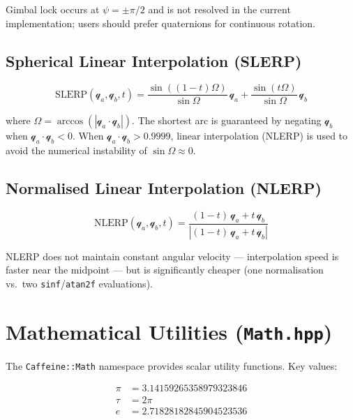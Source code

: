 \documentclass[12pt, a4paper]{report}
\theoremstyle{definition}
\theoremstyle{remark}
\begin{document}
Gimbal lock occurs at $\psi = \pm\pi/2$ and is not resolved in the current
implementation; users should prefer quaternions for continuous rotation.

\subsection{Spherical Linear Interpolation (SLERP)}

\begin{equation}
\text{SLERP}(\mathcal{q}_a, \mathcal{q}_b, t)
= \frac{\sin((1-t)\Omega)}{\sin\Omega}\,\mathcal{q}_a
+ \frac{\sin(t\Omega)}{\sin\Omega}\,\mathcal{q}_b
\label{eq:slerp}
\end{equation}

where $\Omega = \arccos(|\mathcal{q}_a \cdot \mathcal{q}_b|)$.
The shortest arc is guaranteed by negating $\mathcal{q}_b$ when
$\mathcal{q}_a \cdot \mathcal{q}_b < 0$.
When $\mathcal{q}_a \cdot \mathcal{q}_b > 0.9999$, linear interpolation
(NLERP) is used to avoid the numerical instability of $\sin\Omega \approx 0$.

\subsection{Normalised Linear Interpolation (NLERP)}

\begin{equation}
\text{NLERP}(\mathcal{q}_a, \mathcal{q}_b, t)
= \frac{(1-t)\,\mathcal{q}_a + t\,\mathcal{q}_b}{|(1-t)\,\mathcal{q}_a + t\,\mathcal{q}_b|}
\label{eq:nlerp}
\end{equation}

NLERP does not maintain constant angular velocity — interpolation speed
is faster near the midpoint — but is significantly cheaper (one
normalisation vs.\ two \texttt{sinf}/\texttt{atan2f} evaluations).

\section{Mathematical Utilities (\texttt{Math.hpp})}

The \texttt{Caffeine::Math} namespace provides scalar utility functions.
Key values:

\begin{align*}
  \pi &= 3.14159265358979323846 \\
  \tau &= 2\pi \\
  e &= 2.71828182845904523536
\end{align*}
\end{document}

